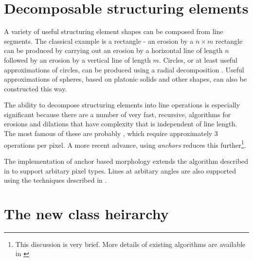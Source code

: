 \documentclass{InsightArticle}
\begin{document}
\section{Decomposable structuring elements}
A variety of useful structuring element shapes can be composed from
line segments. The classical example is a rectangle - an erosion by a
$n \times m$ rectangle can be produced by carrying out an erosion by a
horizontal line of length $n$ followed by an erosion by a vertical
line of length $m$. Circles, or at least useful approximations of
circles, can be produced using a radial decomposition
\cite{Adams93}. Useful approximations of spheres, based on platonic
solids and other shapes, can also be constructed this way.

The ability to decompose structuring elements into line operations is
especially significant because there are a number of very fast,
recursive, algorithms for erosions and dilations that have complexity
that is independent of line length. The most famous of these are
probably \cite{vanHerk1992a,Gil1993}, which require approximately 3
operations per pixel. A more recent advance, using {\em anchors}
\cite{Vandroogenbroeck2005Morphological} reduces this 
further\footnote{This discussion is very brief. More details of
existing algorithms are available in
\cite{Vandroogenbroeck2005Morphological}}.

The implementation of anchor based morphology extends the algorithm
described in \cite{Vandroogenbroeck2005Morphological} to support
arbitary pixel types. Lines at arbitary angles are also supported
using the techniques described in \cite{soille-breen-jones96}.

\section{The new class heirarchy}

\appendix





\nocite{ITKSoftwareGuide}
\end{document}
